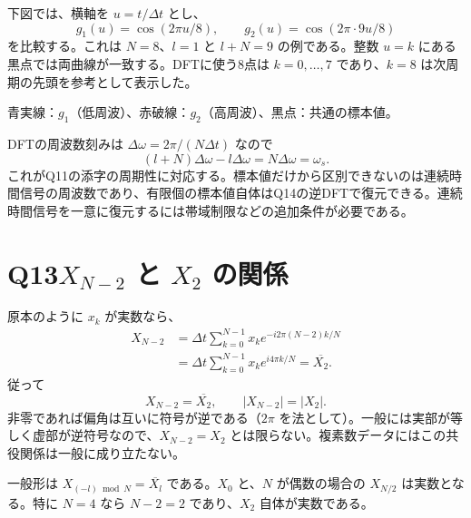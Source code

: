 \documentclass[a4paper,11pt]{article}
\newcommand{\Q}[2]{\section*{Q#1\quad #2}}
\newcommand{\conj}[1]{\overline{#1}}
\begin{document}
下図では、横軸を $u=t/\Delta t$ とし、
\[
g_1(u)=\cos(2\pi u/8),\qquad g_2(u)=\cos(2\pi\cdot9u/8)
\]
を比較する。これは $N=8$、$l=1$ と $l+N=9$ の例である。整数 $u=k$ にある黒点では両曲線が一致する。DFTに使う8点は $k=0,\ldots,7$ であり、$k=8$ は次周期の先頭を参考として表示した。
\begin{center}

{\small 青実線：$g_1$（低周波）、赤破線：$g_2$（高周波）、黒点：共通の標本値。}
\end{center}
DFTの周波数刻みは $\Delta\omega=2\pi/(N\Delta t)$ なので
\[
(l+N)\Delta\omega-l\Delta\omega=N\Delta\omega=\omega_s.
\]
これがQ11の添字の周期性に対応する。標本値だけから区別できないのは連続時間信号の周波数であり、有限個の標本値自体はQ14の逆DFTで復元できる。連続時間信号を一意に復元するには帯域制限などの追加条件が必要である。
\newpage
\Q{13}{$X_{N-2}$ と $X_2$ の関係}
原本のように $x_k$ が実数なら、
\begin{align*}
X_{N-2}
&=\Delta t\sum_{k=0}^{N-1}x_ke^{-i2\pi(N-2)k/N}\\
&=\Delta t\sum_{k=0}^{N-1}x_ke^{i4\pi k/N}
=\conj{X_2}.
\end{align*}
従って
\[
\boxed{X_{N-2}=\conj{X_2}},\qquad
|X_{N-2}|=|X_2|.
\]
非零であれば偏角は互いに符号が逆である（$2\pi$ を法として）。一般には実部が等しく虚部が逆符号なので、$X_{N-2}=X_2$ とは限らない。複素数データにはこの共役関係は一般に成り立たない。

一般形は $X_{(-l)\bmod N}=\conj{X_l}$ である。$X_0$ と、$N$ が偶数の場合の $X_{N/2}$ は実数となる。特に $N=4$ なら $N-2=2$ であり、$X_2$ 自体が実数である。
\end{document}
